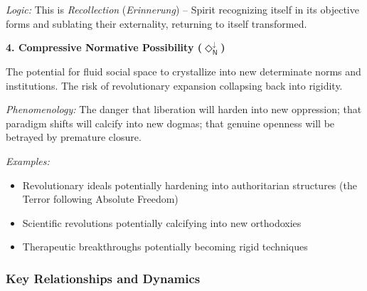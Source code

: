\documentclass[12pt]{book}
\newcommand{\NDiaDown}{\Diamond_{\mathsf{N}}^{\downarrow}}
\begin{document}
\textit{Logic:} This is \textit{Recollection} (\emph{Erinnerung}) -- Spirit recognizing itself in its objective forms and sublating their externality, returning to itself transformed.

\bigskip

\noindent\textbf{4. Compressive Normative Possibility ($\NDiaDown$)}

The potential for fluid social space to crystallize into new determinate norms and institutions. The risk of revolutionary expansion collapsing back into rigidity.

\textit{Phenomenology:} The danger that liberation will harden into new oppression; that paradigm shifts will calcify into new dogmas; that genuine openness will be betrayed by premature closure.

\textit{Examples:}
\begin{itemize}
\item Revolutionary ideals potentially hardening into authoritarian structures (the Terror following Absolute Freedom)
\item Scientific revolutions potentially calcifying into new orthodoxies
\item Therapeutic breakthroughs potentially becoming rigid techniques
\end{itemize}

\subsubsection{Key Relationships and Dynamics}
\end{document}
